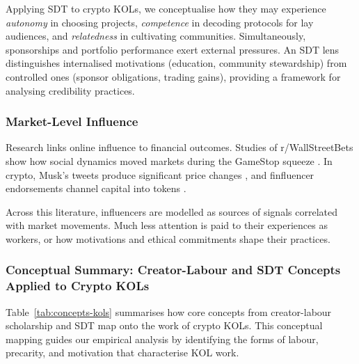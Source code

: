 Applying SDT to crypto KOLs, we conceptualise how they may experience \emph{autonomy} in choosing projects, \emph{competence} in decoding protocols for lay audiences, and \emph{relatedness} in cultivating communities. Simultaneously, sponsorships and portfolio performance exert external pressures. An SDT lens distinguishes internalised motivations (education, community stewardship) from controlled ones (sponsor obligations, trading gains), providing a framework for analysing credibility practices.

\subsubsection{Market-Level Influence}

Research links online influence to financial outcomes. Studies of r/WallStreetBets show how social dynamics moved markets during the GameStop squeeze \cite{LucchiniGamestopWSB2022,warkulat2024}. In crypto, Musk's tweets produce significant price changes \cite{AnteMuskCrypto2023}, and finfluencer endorsements channel capital into tokens \cite{Merkley2024,HayesFinfluence2024,HaaseFinfluencersSentiment2025,MeyerHighOnBitcoin2023}.

Across this literature, influencers are modelled as sources of signals correlated with market movements. Much less attention is paid to their experiences as workers, or how motivations and ethical commitments shape their practices.

\subsubsection{Conceptual Summary: Creator-Labour and SDT Concepts Applied to Crypto KOLs}

Table~\ref{tab:concepts-kols} summarises how core concepts from creator-labour scholarship and SDT map onto the work of crypto KOLs. This conceptual mapping guides our empirical analysis by identifying the forms of labour, precarity, and motivation that characterise KOL work.

